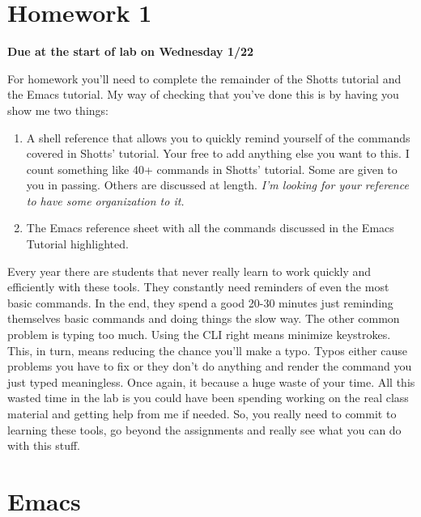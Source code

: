 \documentclass[]{tufte-handout}
\begin{document}
\section{Homework 1}

\begin{center}
\textbf{Due at the start of lab on Wednesday 1/22}
\end{center}

For homework you'll need to complete the remainder of the Shotts tutorial and the Emacs tutorial.  My way of checking that you've done this is by having you show me two things:

\begin{enumerate}
\item A shell reference that allows you to quickly remind yourself of the commands covered in Shotts' tutorial. Your free to add anything else you want to this. I count something like 40+ commands in Shotts' tutorial. Some are given to you in passing. Others are discussed at length.  \textit{I'm looking for your reference to have some organization to it.}

\item The Emacs reference sheet with all the commands discussed in the Emacs Tutorial highlighted.  
\end{enumerate}

Every year there are students that never really learn to work quickly and efficiently with these tools.  They constantly need reminders of even the most basic commands. In the end, they spend a good 20-30 minutes just reminding themselves basic commands and doing things the slow way. The other common problem is typing too much. Using the CLI right means minimize keystrokes. This, in turn, means reducing the chance you'll make a typo. Typos either cause problems you have to fix or they don't do anything and render the command you just typed meaningless.  Once again, it because a huge waste of your time.  All this wasted time in the lab is you could have been spending working on the real class material and getting help from me if needed. So, you really need to commit to learning these tools, go beyond the assignments and really see what you can do with this stuff.

\section{Emacs}
\end{document}
